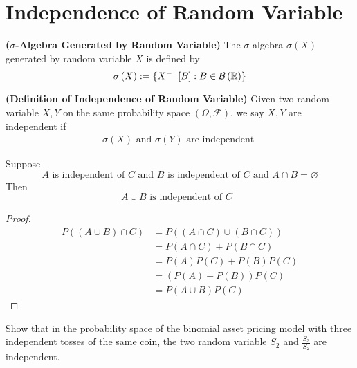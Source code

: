 \documentclass{report}
\begin{document}
\section{Independence of Random Variable}
\begin{definition}
\label{3.2.1}
\textbf{($\sigma$-Algebra Generated by Random Variable)} The $\sigma$-algebra $\sigma\left(X \right)$ generated by random variable $X$ is defined by
 \begin{equation*}
\sigma\left(X \right):=\{ X^{-1}\left[B \right]:B\in \mathcal{B}\left(\mathbb{R} \right) \}
\end{equation*}
\end{definition}
\begin{definition}
\label{3.2.2}
\textbf{(Definition of Independence of Random Variable)} Given two random variable $X,Y$ on the same probability space  $(\Omega,\mathcal{F})$, we say $X,Y$ are independent if 
 \begin{align*}
\sigma (X)\text{ and }\sigma (Y)\text{ are independent }
\end{align*}
\end{definition}
\begin{lemma}
\label{3.2.3}
Suppose 
\begin{equation*}
A\text{ is independent of }C\text{ and }B\text{ is independent of  }C\text{ and }A\cap B=\varnothing
\end{equation*}
Then
\begin{equation*}
A\cup B\text{ is independent of $C$ }
\end{equation*}
\end{lemma}
\begin{proof}
\begin{align*}
P\left(\left(A\cup B \right)\cap C \right)&=P\left(\left(A\cap C \right)\cup \left(B\cap C \right) \right)\\
&=P\left(A\cap C \right)+P\left(B\cap C \right)\\
&=P\left(A \right)P\left(C \right)+P\left(B \right)P\left(C \right)\\
&=\left(P\left(A \right)+P\left(B \right) \right)P\left(C \right)\\
&=P\left(A\cup B \right)P\left(C \right)
\end{align*}
\end{proof}
\begin{question}{}{}
Show that in the probability space of the binomial asset pricing model with three independent tosses of the same coin, the two random variable  $S_2$ and $\frac{S_3}{S_2}$ are independent.
\end{question}
\end{document}
